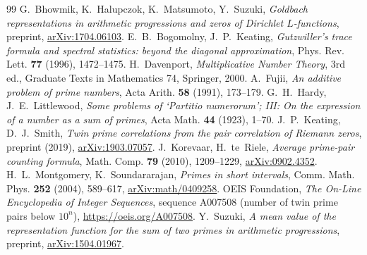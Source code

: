 \documentclass[11pt]{amsart}
\theoremstyle{remark}
\begin{document}
\begin{thebibliography}{99}
 G.~Bhowmik, K.~Halupczok, K.~Matsumoto, Y.~Suzuki, \emph{Goldbach representations in arithmetic progressions and zeros of Dirichlet $L$-functions}, preprint, \href{https://arxiv.org/abs/1704.06103}{arXiv:1704.06103}.
 E.~B.~Bogomolny, J.~P.~Keating, \emph{Gutzwiller's trace formula and spectral statistics: beyond the diagonal approximation}, Phys. Rev. Lett. \textbf{77} (1996), 1472--1475.
 H.~Davenport, \emph{Multiplicative Number Theory}, 3rd ed., Graduate Texts in Mathematics 74, Springer, 2000.
 A.~Fujii, \emph{An additive problem of prime numbers}, Acta Arith. \textbf{58} (1991), 173--179.
 G.~H.~Hardy, J.~E.~Littlewood, \emph{Some problems of `Partitio numerorum'; III: On the expression of a number as a sum of primes}, Acta Math. \textbf{44} (1923), 1--70.
 J.~P.~Keating, D.~J.~Smith, \emph{Twin prime correlations from the pair correlation of Riemann zeros}, preprint (2019), \href{https://arxiv.org/abs/1903.07057}{arXiv:1903.07057}.
 J.~Korevaar, H.~te~Riele, \emph{Average prime-pair counting formula}, Math. Comp. \textbf{79} (2010), 1209--1229, \href{https://arxiv.org/abs/0902.4352}{arXiv:0902.4352}.
 H.~L.~Montgomery, K.~Soundararajan, \emph{Primes in short intervals}, Comm. Math. Phys. \textbf{252} (2004), 589--617, \href{https://arxiv.org/abs/math/0409258}{arXiv:math/0409258}.
 OEIS Foundation, \emph{The On-Line Encyclopedia of Integer Sequences}, sequence A007508 (number of twin prime pairs below $10^n$), \url{https://oeis.org/A007508}.
 Y.~Suzuki, \emph{A mean value of the representation function for the sum of two primes in arithmetic progressions}, preprint, \href{https://arxiv.org/abs/1504.01967}{arXiv:1504.01967}.
\end{thebibliography}
\end{document}
